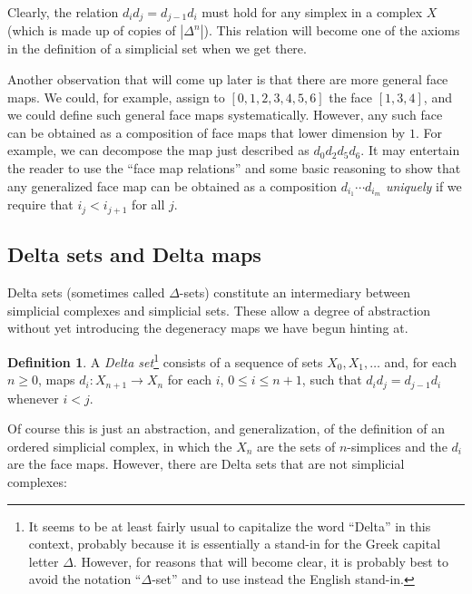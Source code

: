 \documentclass[12pt]{article}
\theoremstyle{plain}
\theoremstyle{definition}
\newtheorem{definition}[theorem]{Definition}
\begin{document}
Clearly, the relation $d_id_j=d_{j-1}d_i$ must hold for any simplex in a complex $X$ (which is made up of copies of $|\Delta^n|$). This relation  will become one of the axioms in the definition of a simplicial set when we get there.


Another observation that will come up later is that there are more general face maps. We could, for example, assign to $[0,1,2,3,4,5,6]$ the face $[1,3,4]$, and we could define such general face maps systematically. However, any such face can be obtained as a composition of face maps that lower dimension by $1$. For example, we can decompose the map just described as $d_0d_2d_5d_6$. It may entertain the reader to use the ``face map relations'' and some basic reasoning to show that any generalized face map can be obtained as a composition $d_{i_1}\cdots d_{i_m}$ \emph{uniquely} if we require that $i_j<i_{j+1}$ for all $j$.












\subsection{Delta sets and Delta maps}


Delta sets (sometimes called $\Delta$-sets) constitute an intermediary between simplicial complexes and simplicial sets. These allow a degree of abstraction without yet introducing the degeneracy maps we have begun hinting at.

\begin{definition}
A \emph{Delta set}\footnote{It seems to be at least fairly usual to capitalize the word ``Delta'' in this context, probably because it is essentially a stand-in for the Greek capital letter $\Delta$. However, for reasons that will become clear, it is probably best to avoid the notation ``$\Delta$-set'' and to use instead the English stand-in.} consists of a sequence of  sets $X_0, X_1, \ldots$ and, for each $n\geq 0$, maps $d_i\colon X_{n+1}\to X_n$ for each $i$, $0\leq i\leq n+1$, such that $d_id_j=d_{j-1}d_i$ whenever $i<j$.
\end{definition}

Of course this is just an abstraction, and generalization, of the definition of an ordered simplicial complex, in which the $X_n$ are the sets of $n$-simplices and the $d_i$ are the face maps. However, there are Delta sets that are not simplicial complexes:
\end{document}
